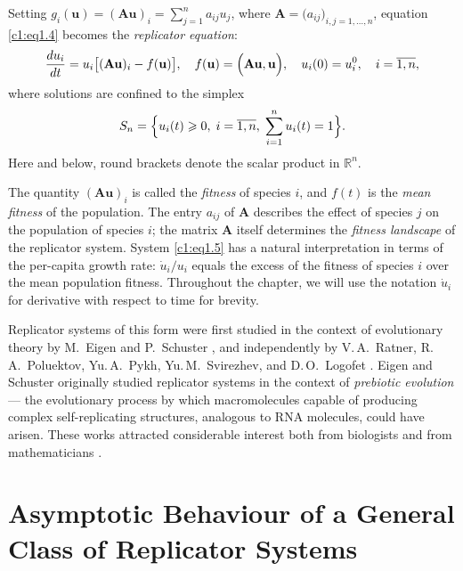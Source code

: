 \documentclass[12pt]{report}
\newcommand{\R}{\mathbb{R}}
\theoremstyle{definition}
\theoremstyle{remark}
\begin{document}
Setting $g_{i}(\mathbf{u})=(\mathbf{Au})_{i}=\sum_{j=1}^{n}a_{ij}u_{j}$,
where $\mathbf{A} = \bigl( a_{ij}\bigr)_{i,j=1,\ldots,n}$, equation \eqref{c1:eq1.4}
becomes the \emph{replicator equation}:
\begin{equation}
  \frac{du_{i}}{dt}=u_{i}\bigl[(\mathbf{Au})_{i}-f(\mathbf{u})\bigr],
  \quad f(\mathbf{u})=\Bigl(\mathbf{Au},\mathbf{u}\Bigr),
  \quad u_{i}(0)=u_{i}^{0},\quad i=\overline{1,n},
  \label{c1:eq1.5}
\end{equation}
where solutions are confined to the simplex
\[
  S_{n}=\Bigl\{u_{i}(t)\geqslant 0,\;i=\overline{1,n},\;
               \sum_{i=1}^{n}u_{i}(t)=1\Bigr\}.
\]
Here and below, round brackets denote the scalar product in $\R^{n}$.

The quantity $(\mathbf{Au})_{i}$ is called the \emph{fitness} of
species $i$, and $f(t)$ is the \emph{mean fitness} of the population.
The entry $a_{ij}$ of $\mathbf{A}$ describes the effect of species $j$
on the population of species $i$; the matrix $\mathbf{A}$ itself determines the \emph{fitness landscape} of the replicator system.
System \eqref{c1:eq1.5} has a natural interpretation in terms of the
per-capita growth rate: $\dot{u}_{i}/u_{i}$ equals the excess of the
fitness of species $i$ over the mean population fitness. Throughout the chapter, we will use the notation $\dot{u}_i$ for derivative with respect to time for brevity.

Replicator systems of this form were first studied in the context of
evolutionary theory by M.~Eigen and P.~Schuster
\cite{c1:Eigen1971,c1:Eigen1977,c1:Eigen1982}, and independently by
V.\,A.~Ratner, R.\,A.~Poluektov, Yu.\,A.~Pykh, Yu.\,M.~Svirezhev,
and D.\,O.~Logofet
\cite{c1:Poluektov1974,c1:Svirezhev1978,c1:MaynardSmith1973,c1:Taylor1978}. 
Eigen and Schuster originally studied replicator systems in the
context of \emph{prebiotic evolution} — the evolutionary process by
which macromolecules capable of producing complex self-replicating structures, analogous to RNA molecules, could have arisen.  These
works attracted considerable interest both from biologists
\cite{c1:Lincoln2009,c1:Vaidya2012} and from mathematicians
\cite{c1:Hofbauer1998,c1:Hofbauer2003}.

\section{Asymptotic Behaviour of a General Class of Replicator Systems}
\label{c1:section:1.2}
\end{document}
